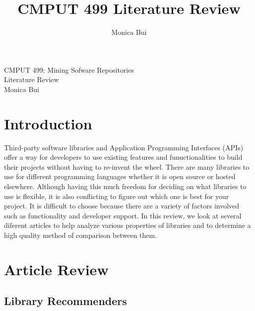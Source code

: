 \documentclass[12pt]{article}
\title{CMPUT 499 Literature Review}
\author{Monica Bui}
\begin{document}
\begin{titlepage}
    \centering
    \large
    \vspace{1cm}
    CMPUT 499: Mining Sofware Repositories \\
    \vspace{1cm}
    Literature Review \\
    \vspace{1cm}
    Monica Bui
\end{titlepage}



\newpage
\section{Introduction}
Third-party software libraries and Application Programming Interfaces (APIs) offer a way for developers
to use existing features and funuctionalities to build their projects without having to re-invent the wheel.
There are many libraries to use for different programming languages whether it is open source 
or hosted elsewhere. Although having this much freedom for deciding on what libraries to use is flexible,
it is also conflicting to figure out which one is best for your project. It is difficult to choose because
there are a variety of factors involved such as functionality and developer support. 
In this review, we look at several diferent articles to help analyze various properties of libraries and 
to determine a high quality method of comparison between them.

\section{Article Review}


\subsection{Library Recommenders}
\end{document}
